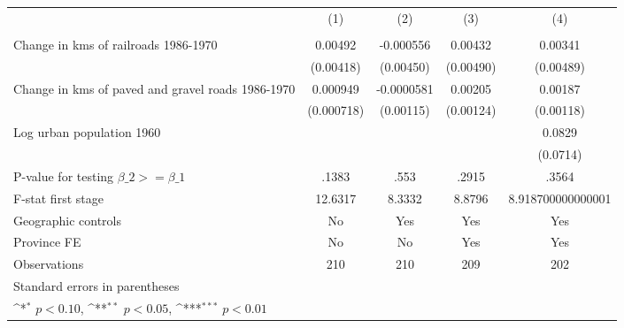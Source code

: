 {
\def\sym#1{\ifmmode^{#1}\else\(^{#1}\)\fi}
\begin{tabular}{l*{4}{c}}
\hline\hline
                &\multicolumn{1}{c}{(1)}&\multicolumn{1}{c}{(2)}&\multicolumn{1}{c}{(3)}&\multicolumn{1}{c}{(4)}\\
                &\multicolumn{1}{c}{}&\multicolumn{1}{c}{}&\multicolumn{1}{c}{}&\multicolumn{1}{c}{}\\
\hline
Change in kms of railroads 1986-1970&  0.00492         &-0.000556         &  0.00432         &  0.00341         \\
                &(0.00418)         &(0.00450)         &(0.00490)         &(0.00489)         \\
[1em]
Change in kms of paved and gravel roads 1986-1970& 0.000949         &-0.0000581         &  0.00205         &  0.00187         \\
                &(0.000718)         &(0.00115)         &(0.00124)         &(0.00118)         \\
[1em]
Log urban population 1960&                  &                  &                  &   0.0829         \\
                &                  &                  &                  & (0.0714)         \\
\hline
P-value for testing $\beta\_{2} >= \beta\_{1}$&    .1383         &     .553         &    .2915         &    .3564         \\
F-stat first stage&  12.6317         &   8.3332         &   8.8796         &8.918700000000001         \\
Geographic controls&       No         &      Yes         &      Yes         &      Yes         \\
Province FE     &       No         &       No         &      Yes         &      Yes         \\
Observations    &      210         &      210         &      209         &      202         \\
\hline\hline
\multicolumn{5}{l}{\footnotesize Standard errors in parentheses}\\
\multicolumn{5}{l}{\footnotesize \sym{*} \(p<0.10\), \sym{**} \(p<0.05\), \sym{***} \(p<0.01\)}\\
\end{tabular}
}
